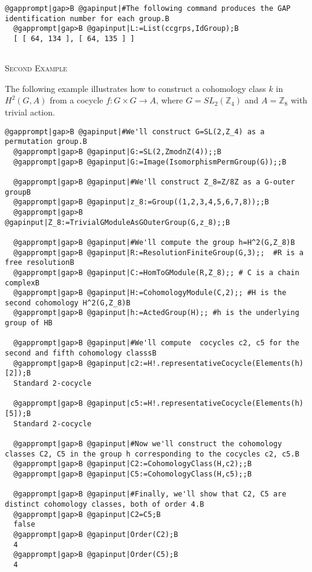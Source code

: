 \documentclass[a4paper,11pt]{report}
\begin{document}
{{\begin{Verbatim}[commandchars=@|B,fontsize=\small,frame=single,label=Example]
  @gapprompt|gap>B @gapinput|#The following command produces the GAP identification number for each group.B
  @gapprompt|gap>B @gapinput|L:=List(ccgrps,IdGroup);B
  [ [ 64, 134 ], [ 64, 135 ] ]
  
\end{Verbatim}
 

\textsc{Second Example} 

The following example illustrates how to construct a cohomology class $k$ in $H^2(G, A)$ from a cocycle $f:G \times G \rightarrow A$, where $G=SL_2(\mathbb Z_4)$ and $A=\mathbb Z_8$ with trivial action. 
\begin{Verbatim}[commandchars=@|B,fontsize=\small,frame=single,label=Example]
  @gapprompt|gap>B @gapinput|#We'll construct G=SL(2,Z_4) as a permutation group.B
  @gapprompt|gap>B @gapinput|G:=SL(2,ZmodnZ(4));;B
  @gapprompt|gap>B @gapinput|G:=Image(IsomorphismPermGroup(G));;B
  
  @gapprompt|gap>B @gapinput|#We'll construct Z_8=Z/8Z as a G-outer groupB
  @gapprompt|gap>B @gapinput|z_8:=Group((1,2,3,4,5,6,7,8));;B
  @gapprompt|gap>B @gapinput|Z_8:=TrivialGModuleAsGOuterGroup(G,z_8);;B
  
  @gapprompt|gap>B @gapinput|#We'll compute the group h=H^2(G,Z_8)B
  @gapprompt|gap>B @gapinput|R:=ResolutionFiniteGroup(G,3);;  #R is a free resolutionB
  @gapprompt|gap>B @gapinput|C:=HomToGModule(R,Z_8);; # C is a chain complexB
  @gapprompt|gap>B @gapinput|H:=CohomologyModule(C,2);; #H is the second cohomology H^2(G,Z_8)B
  @gapprompt|gap>B @gapinput|h:=ActedGroup(H);; #h is the underlying group of HB
  
  @gapprompt|gap>B @gapinput|#We'll compute  cocycles c2, c5 for the second and fifth cohomology classsB
  @gapprompt|gap>B @gapinput|c2:=H!.representativeCocycle(Elements(h)[2]);B
  Standard 2-cocycle 
  
  @gapprompt|gap>B @gapinput|c5:=H!.representativeCocycle(Elements(h)[5]);B
  Standard 2-cocycle 
  
  @gapprompt|gap>B @gapinput|#Now we'll construct the cohomology classes C2, C5 in the group h corresponding to the cocycles c2, c5.B
  @gapprompt|gap>B @gapinput|C2:=CohomologyClass(H,c2);;B
  @gapprompt|gap>B @gapinput|C5:=CohomologyClass(H,c5);;B
   
  @gapprompt|gap>B @gapinput|#Finally, we'll show that C2, C5 are distinct cohomology classes, both of order 4.B
  @gapprompt|gap>B @gapinput|C2=C5;B
  false
  @gapprompt|gap>B @gapinput|Order(C2);B
  4
  @gapprompt|gap>B @gapinput|Order(C5);B
  4
  

\end{Verbatim}}}
\end{document}

